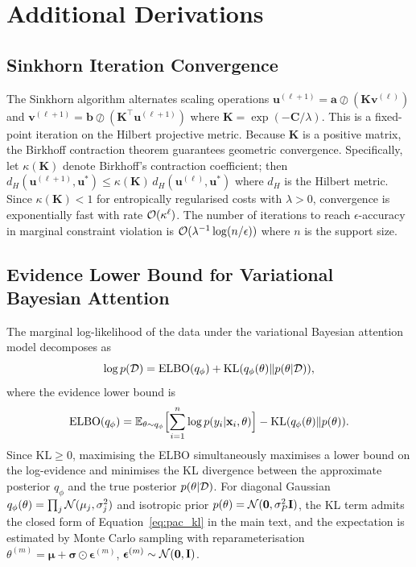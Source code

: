 \section{Additional Derivations}
\label{app:additional}

\subsection{Sinkhorn Iteration Convergence}
\label{app:sinkhorn}

The Sinkhorn algorithm alternates scaling operations $\mathbf{u}^{(\ell+1)}=\mathbf{a}\oslash(\mathbf{K}\mathbf{v}^{(\ell)})$ and $\mathbf{v}^{(\ell+1)}=\mathbf{b}\oslash(\mathbf{K}^\top\mathbf{u}^{(\ell+1)})$ where $\mathbf{K}=\exp(-\mathbf{C}/\lambda)$. This is a fixed-point iteration on the Hilbert projective metric. Because $\mathbf{K}$ is a positive matrix, the Birkhoff contraction theorem guarantees geometric convergence. Specifically, let $\kappa(\mathbf{K})$ denote Birkhoff's contraction coefficient; then $d_H(\mathbf{u}^{(\ell+1)},\mathbf{u}^*)\le\kappa(\mathbf{K})\,d_H(\mathbf{u}^{(\ell)},\mathbf{u}^*)$ where $d_H$ is the Hilbert metric. Since $\kappa(\mathbf{K})<1$ for entropically regularised costs with $\lambda>0$, convergence is exponentially fast with rate $\mathcal{O}(\kappa^{\ell})$. The number of iterations to reach $\epsilon$-accuracy in marginal constraint violation is $\mathcal{O}(\lambda^{-1}\log(n/\epsilon))$ where $n$ is the support size.


\subsection{Evidence Lower Bound for Variational Bayesian Attention}
\label{app:elbo}

The marginal log-likelihood of the data under the variational Bayesian attention model decomposes as
\begin{equation}
\log p(\mathcal{D}) = \mathrm{ELBO}(q_\phi) + \mathrm{KL}(q_\phi(\theta)\|p(\theta|\mathcal{D})),
\end{equation}
where the evidence lower bound is
\begin{equation}
\mathrm{ELBO}(q_\phi) = \mathbb{E}_{\theta\sim q_\phi}\Bigl[\sum_{i=1}^n\log p(y_i|\mathbf{x}_i,\theta)\Bigr] - \mathrm{KL}(q_\phi(\theta)\|p(\theta)).
\end{equation}
Since $\mathrm{KL}\ge 0$, maximising the ELBO simultaneously maximises a lower bound on the log-evidence and minimises the KL divergence between the approximate posterior $q_\phi$ and the true posterior $p(\theta|\mathcal{D})$. For diagonal Gaussian $q_\phi(\theta)=\prod_j\mathcal{N}(\mu_j,\sigma_j^2)$ and isotropic prior $p(\theta)=\mathcal{N}(\mathbf{0},\sigma_P^2\mathbf{I})$, the KL term admits the closed form of Equation~\eqref{eq:pac_kl} in the main text, and the expectation is estimated by Monte Carlo sampling with reparameterisation $\theta^{(m)}=\bm{\mu}+\bm{\sigma}\odot\bm{\epsilon}^{(m)}$, $\bm{\epsilon}^{(m)}\sim\mathcal{N}(\mathbf{0},\mathbf{I})$.


